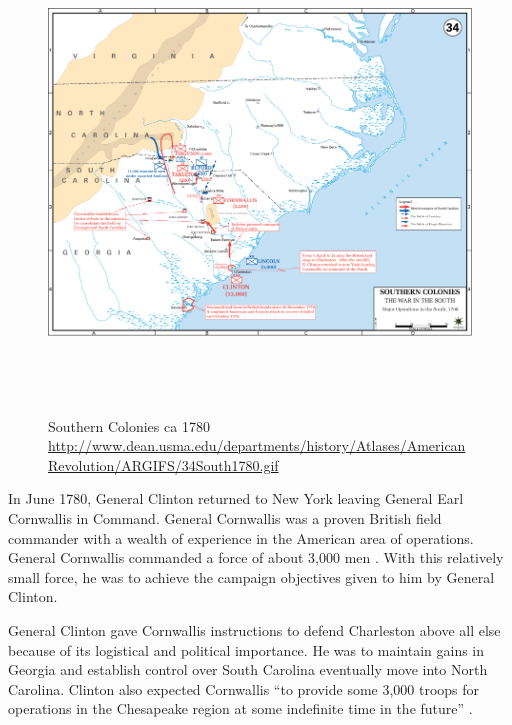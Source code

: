 \begin{figure}[ht]
\begin{center}
\includegraphics[height=5in]{gfx/34South1780}
\end{center}
\caption{Southern Colonies ca 1780 \url{http://www.dean.usma.edu/departments/history/Atlases/AmericanRevolution/ARGIFS/34South1780.gif}}
\label{Nicholson4}
\end{figure}



In June 1780, General Clinton returned to New York leaving General Earl
Cornwallis in Command.  General Cornwallis was a proven British field commander
with a wealth of experience in the American area of operations.  General
Cornwallis commanded a force of about 3,000 men
\cite[p.51]{woodward_comparative_2002}.  With this
relatively small force, he was to achieve the campaign objectives given to him
by General Clinton.  

General Clinton gave Cornwallis instructions to defend Charleston above all else
because of its logistical and political importance.  He was to maintain gains in
Georgia and establish control over South Carolina eventually move into North
Carolina.  Clinton also expected Cornwallis “to provide some 3,000 troops for
operations in the Chesapeake region at some indefinite time in the future”
\cite[p.51]{woodward_comparative_2002}.  

